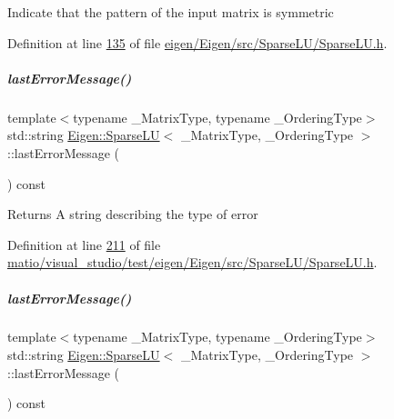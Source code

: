 Indicate that the pattern of the input matrix is symmetric 

Definition at line \hyperlink{eigen_2_eigen_2src_2_sparse_l_u_2_sparse_l_u_8h_source_l00135}{135} of file \hyperlink{eigen_2_eigen_2src_2_sparse_l_u_2_sparse_l_u_8h_source}{eigen/\+Eigen/src/\+Sparse\+L\+U/\+Sparse\+L\+U.\+h}.

\mbox{\label{group___sparse_l_u___module_a5458c4e851d7d75c8ca92c4fd02d2adb}} 
\subparagraph{\texorpdfstring{last\+Error\+Message()}{lastErrorMessage()}\hspace{0.1cm}{\footnotesize\ttfamily [1/2]}}
{\footnotesize\ttfamily template$<$typename \+\_\+\+Matrix\+Type, typename \+\_\+\+Ordering\+Type$>$ \\
std\+::string \hyperlink{group___sparse_l_u___module_class_eigen_1_1_sparse_l_u}{Eigen\+::\+Sparse\+LU}$<$ \+\_\+\+Matrix\+Type, \+\_\+\+Ordering\+Type $>$\+::last\+Error\+Message (\begin{DoxyParamCaption}{ }\end{DoxyParamCaption}) const\hspace{0.3cm}{\ttfamily [inline]}}

\begin{DoxyReturn}{Returns}
A string describing the type of error 
\end{DoxyReturn}


Definition at line \hyperlink{matio_2visual__studio_2test_2eigen_2_eigen_2src_2_sparse_l_u_2_sparse_l_u_8h_source_l00211}{211} of file \hyperlink{matio_2visual__studio_2test_2eigen_2_eigen_2src_2_sparse_l_u_2_sparse_l_u_8h_source}{matio/visual\+\_\+studio/test/eigen/\+Eigen/src/\+Sparse\+L\+U/\+Sparse\+L\+U.\+h}.

\mbox{\label{group___sparse_l_u___module_a5458c4e851d7d75c8ca92c4fd02d2adb}} 
\subparagraph{\texorpdfstring{last\+Error\+Message()}{lastErrorMessage()}\hspace{0.1cm}{\footnotesize\ttfamily [2/2]}}
{\footnotesize\ttfamily template$<$typename \+\_\+\+Matrix\+Type, typename \+\_\+\+Ordering\+Type$>$ \\
std\+::string \hyperlink{group___sparse_l_u___module_class_eigen_1_1_sparse_l_u}{Eigen\+::\+Sparse\+LU}$<$ \+\_\+\+Matrix\+Type, \+\_\+\+Ordering\+Type $>$\+::last\+Error\+Message (\begin{DoxyParamCaption}{ }\end{DoxyParamCaption}) const\hspace{0.3cm}{\ttfamily [inline]}}


